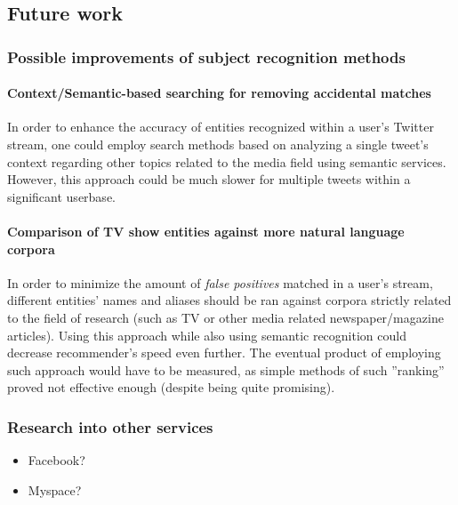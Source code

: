 \subsection{Future work}

\subsubsection{Possible improvements of subject recognition methods}

\paragraph{Context/Semantic-based searching for removing accidental matches}
In order to enhance the accuracy of entities recognized within a user's Twitter stream, one could employ search methods
based on analyzing a single tweet's context regarding other topics related to the media field using semantic services.
However, this approach could be much slower for multiple tweets within a significant userbase.

\paragraph{Comparison of TV show entities against more natural language corpora}
In order to minimize the amount of \textit{false positives} matched in a user's stream, different entities' names and aliases
should be ran against corpora strictly related to the field of research (such as TV or other media related newspaper/magazine
articles). Using this approach while also using semantic recognition could decrease recommender's speed even further. The
eventual product of employing such approach would have to be measured, as simple methods of such ''ranking'' proved not effective enough (despite being quite promising).

\subsubsection{Research into other services}
\begin{itemize}
  \item Facebook?
  \item Myspace?
\end{itemize}
